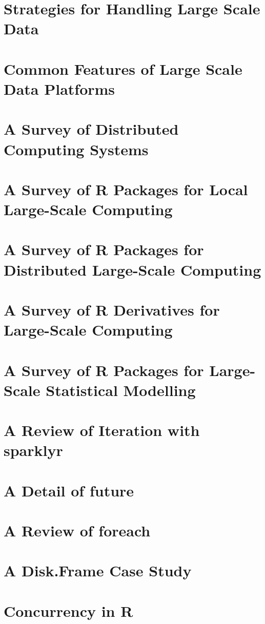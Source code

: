 
\section{Strategies for Handling Large Scale Data}

\section{Common Features of Large Scale Data Platforms}

\section{A Survey of Distributed Computing Systems}

\section{A Survey of R Packages for Local Large-Scale Computing}

\section{A Survey of R Packages for Distributed Large-Scale Computing}

\section{A Survey of R Derivatives for Large-Scale Computing}

\section{A Survey of R Packages for Large-Scale Statistical Modelling}

\section{A Review of Iteration with sparklyr}

\section{A Detail of future}

\section{A Review of foreach}

\section{A Disk.Frame Case Study}

\section{Concurrency in R}

